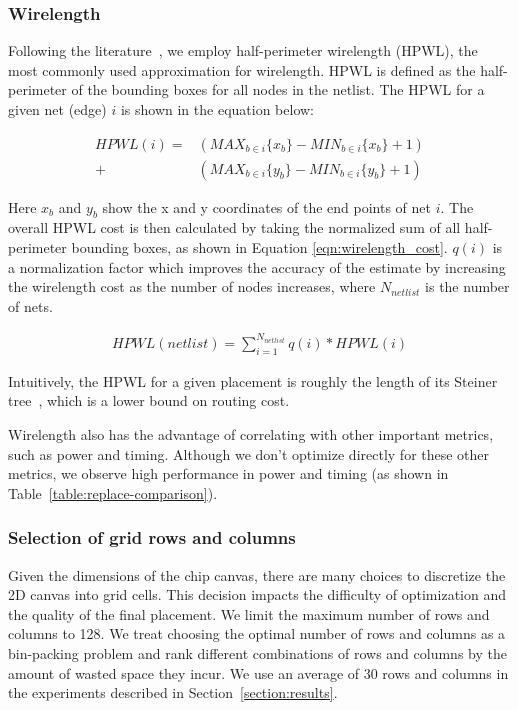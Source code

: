 \documentclass{article}
\begin{document}
\subsubsection{Wirelength}
\label{section:wirelength}
Following the literature~\cite{hpwl1991}, we employ half-perimeter wirelength (HPWL), the most commonly used approximation for wirelength. HPWL is defined as the half-perimeter of the bounding boxes for all nodes in the netlist. The HPWL for a given net (edge) $i$ is shown in the equation below:

\begin{eqnarray}
  \label{eqn:hpwl}
  HPWL(i) = & (MAX_{b \in i}\{x_b\} - MIN_{b \in i}\{x_b\} + 1) \\ \nonumber 
         + & (MAX_{b \in i}\{y_b\} - MIN_{b \in i}\{y_b\} + 1) 
\end{eqnarray}

Here $x_b$ and $y_b$ show the x and y coordinates of the end points of net $i$. The overall HPWL cost is then calculated by taking the normalized sum of all half-perimeter bounding boxes, as shown in Equation \ref{eqn:wirelength_cost}. $q(i)$ is a normalization factor which improves the accuracy of the estimate by increasing the wirelength cost as the number of nodes increases, where $N_{netlist}$ is the number of nets. 

\begin{eqnarray}
  \label{eqn:wirelength_cost}
  HPWL(netlist) = \sum_{i=1}^{N_{netlist}}q(i)*HPWL(i)
\end{eqnarray}

Intuitively, the HPWL for a given placement is roughly the length of its Steiner tree~\cite{gilbert1968steiner}, which is a lower bound on routing cost.

Wirelength also has the advantage of correlating with other important metrics, such as power and timing. Although we don't optimize directly for these other metrics, we observe high performance in power and timing (as shown in Table~\ref{table:replace-comparison}).

\subsubsection{Selection of grid rows and columns}
\label{section:selecting_rows_and_columns}
Given the dimensions of the chip canvas, there are many choices to discretize the 2D canvas into grid cells. This decision impacts the difficulty of optimization and the quality of the final placement. We limit the maximum number of rows and columns to 128. We treat choosing the optimal number of rows and columns as a bin-packing problem and rank different combinations of rows and columns by the amount of wasted space they incur. We use an average of 30 rows and columns in the experiments described in Section~\ref{section:results}.
\end{document}
